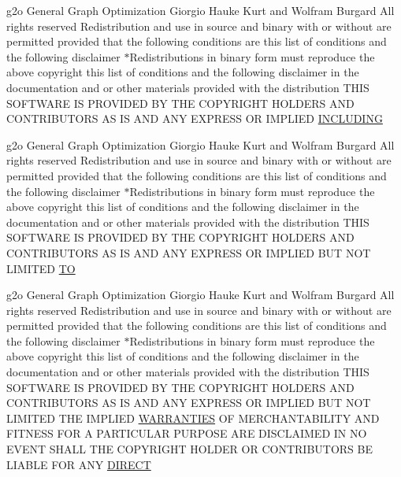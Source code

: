 \begin{DoxyCompactItemize}
\item 
g2o General Graph Optimization Giorgio Hauke Kurt and Wolfram Burgard All rights reserved Redistribution and use in source and binary with or without are permitted provided that the following conditions are this list of conditions and the following disclaimer $\ast$Redistributions in binary form must reproduce the above copyright this list of conditions and the following disclaimer in the documentation and or other materials provided with the distribution T\+H\+IS S\+O\+F\+T\+W\+A\+RE IS P\+R\+O\+V\+I\+D\+ED BY T\+HE C\+O\+P\+Y\+R\+I\+G\+HT H\+O\+L\+D\+E\+RS A\+ND C\+O\+N\+T\+R\+I\+B\+U\+T\+O\+RS AS IS A\+ND A\+NY E\+X\+P\+R\+E\+SS OR I\+M\+P\+L\+I\+ED \hyperlink{license-bsd_8txt_aad5ea521b66beb52ecca7b476bdbf706}{I\+N\+C\+L\+U\+D\+I\+NG}
\item 
g2o General Graph Optimization Giorgio Hauke Kurt and Wolfram Burgard All rights reserved Redistribution and use in source and binary with or without are permitted provided that the following conditions are this list of conditions and the following disclaimer $\ast$Redistributions in binary form must reproduce the above copyright this list of conditions and the following disclaimer in the documentation and or other materials provided with the distribution T\+H\+IS S\+O\+F\+T\+W\+A\+RE IS P\+R\+O\+V\+I\+D\+ED BY T\+HE C\+O\+P\+Y\+R\+I\+G\+HT H\+O\+L\+D\+E\+RS A\+ND C\+O\+N\+T\+R\+I\+B\+U\+T\+O\+RS AS IS A\+ND A\+NY E\+X\+P\+R\+E\+SS OR I\+M\+P\+L\+I\+ED B\+UT N\+OT L\+I\+M\+I\+T\+ED \hyperlink{license-bsd_8txt_a3abe64e9d6972c3df3a932f316dfc926}{TO}
\item 
g2o General Graph Optimization Giorgio Hauke Kurt and Wolfram Burgard All rights reserved Redistribution and use in source and binary with or without are permitted provided that the following conditions are this list of conditions and the following disclaimer $\ast$Redistributions in binary form must reproduce the above copyright this list of conditions and the following disclaimer in the documentation and or other materials provided with the distribution T\+H\+IS S\+O\+F\+T\+W\+A\+RE IS P\+R\+O\+V\+I\+D\+ED BY T\+HE C\+O\+P\+Y\+R\+I\+G\+HT H\+O\+L\+D\+E\+RS A\+ND C\+O\+N\+T\+R\+I\+B\+U\+T\+O\+RS AS IS A\+ND A\+NY E\+X\+P\+R\+E\+SS OR I\+M\+P\+L\+I\+ED B\+UT N\+OT L\+I\+M\+I\+T\+ED T\+HE I\+M\+P\+L\+I\+ED \hyperlink{license-bsd_8txt_aada97a6c44c9b8b4b0cfb3a641d0fe51}{W\+A\+R\+R\+A\+N\+T\+I\+ES} OF M\+E\+R\+C\+H\+A\+N\+T\+A\+B\+I\+L\+I\+TY A\+ND F\+I\+T\+N\+E\+SS F\+OR A P\+A\+R\+T\+I\+C\+U\+L\+AR P\+U\+R\+P\+O\+SE A\+RE D\+I\+S\+C\+L\+A\+I\+M\+ED IN NO E\+V\+E\+NT S\+H\+A\+LL T\+HE C\+O\+P\+Y\+R\+I\+G\+HT H\+O\+L\+D\+ER OR C\+O\+N\+T\+R\+I\+B\+U\+T\+O\+RS BE L\+I\+A\+B\+LE F\+OR A\+NY \hyperlink{license-bsd_8txt_a8ea6ac62e7a976af5669e7f528e4efc3}{D\+I\+R\+E\+CT}

\end{DoxyCompactItemize}
